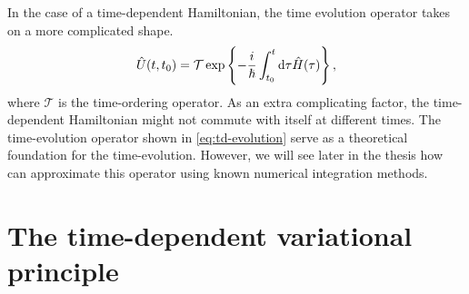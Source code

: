         In the case of a time-dependent Hamiltonian, the time evolution operator
        takes on a more complicated shape.
        \begin{align}
            \hat{U}(t, t_0) =
            \mathcal{T}\exp\left\{ 
                -\frac{i}{\hslash} \int_{t_0}^{t} \dd\tau
                \hat{H}(\tau)
             \right\},
            \label{eq:td-evolution}
        \end{align}
        where $\mathcal{T}$ is the time-ordering operator.
        As an extra complicating factor, the time-dependent Hamiltonian might
        not commute with itself at different times.
        The time-evolution operator shown in \autoref{eq:td-evolution} serve as
        a theoretical foundation for the time-evolution.
        However, we will see later in the thesis how can approximate this
        operator using known numerical integration methods.

    \section{The time-dependent variational principle}

